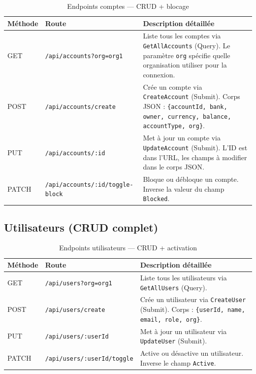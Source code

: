 \documentclass[12pt,a4paper,twoside]{report}
\begin{document}
\begin{table}[H]
\centering
\begin{tabularx}{\textwidth}{llX}
\toprule
\textbf{Méthode} & \textbf{Route} & \textbf{Description détaillée} \\
\midrule
GET & \texttt{/api/accounts?org=org1} & Liste tous les comptes via \texttt{GetAllAccounts} (Query). Le paramètre \texttt{org} spécifie quelle organisation utiliser pour la connexion. \\
POST & \texttt{/api/accounts/create} & Crée un compte via \texttt{CreateAccount} (Submit). Corps JSON : \texttt{\{accountId, bank, owner, currency, balance, accountType, org\}}. \\
PUT & \texttt{/api/accounts/:id} & Met à jour un compte via \texttt{UpdateAccount} (Submit). L'ID est dans l'URL, les champs à modifier dans le corps JSON. \\
PATCH & \texttt{/api/accounts/:id/toggle-block} & Bloque ou débloque un compte. Inverse la valeur du champ \texttt{Blocked}. \\
\bottomrule
\end{tabularx}
\caption{Endpoints comptes --- CRUD + blocage}
\end{table}

\subsection{Utilisateurs (CRUD complet)}

\begin{table}[H]
\centering
\begin{tabularx}{\textwidth}{llX}
\toprule
\textbf{Méthode} & \textbf{Route} & \textbf{Description détaillée} \\
\midrule
GET & \texttt{/api/users?org=org1} & Liste tous les utilisateurs via \texttt{GetAllUsers} (Query). \\
POST & \texttt{/api/users/create} & Crée un utilisateur via \texttt{CreateUser} (Submit). Corps : \texttt{\{userId, name, email, role, org\}}. \\
PUT & \texttt{/api/users/:userId} & Met à jour un utilisateur via \texttt{UpdateUser} (Submit). \\
PATCH & \texttt{/api/users/:userId/toggle} & Active ou désactive un utilisateur. Inverse le champ \texttt{Active}. \\
\bottomrule
\end{tabularx}
\caption{Endpoints utilisateurs --- CRUD + activation}
\end{table}
\end{document}
